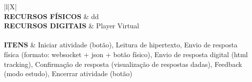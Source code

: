 \begin{xltabular}{\textwidth}{|l|X|}
	 \\ \hline
	\textbf{RECURSOS FÍSICOS} & dd\\ \hline
	\textbf{RECURSOS DIGITAIS} & Player Virtual \\ \hline		
	 \\ \hline
	\textbf{ITENS} & Iniciar atividade (botão), Leitura de hipertexto, Envio de resposta física (formato: websocket + json + botão físico), Envio de resposta digital (html tracking), Confirmação de resposta (visualização de respostas dadas), Feedback (modo estudo), Encerrar atividade (botão)  \\ \hline
	
\end{xltabular}

